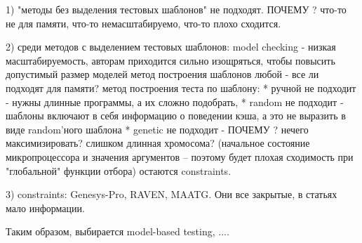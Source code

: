 \documentclass[14pt]{extreport}
\begin{document}
1) "методы без выделения тестовых шаблонов" не подходят. ПОЧЕМУ ? что-то не для памяти, что-то немасштабируемо, что-то плохо сходится.

2) среди методов с выделением тестовых шаблонов:
		model checking - низкая масштабируемость, авторам приходится сильно изощряться, чтобы повысить допустимый размер моделей
		метод построения шаблонов любой - все ли подходят для памяти?
		метод построения теста по шаблону:
			* ручной не подходит - нужны длинные программы, а их сложно подобрать,
			* random не подходит - шаблоны включают в себя информацию о поведении кэша, а это не выразить в виде random'ного шаблона
			* genetic не подходит - ПОЧЕМУ ? нечего максимизировать? слишком длинная хромосома? (начальное состояние микропроцессора и значения аргументов -- поэтому будет плохая сходимость при "глобальной" функции отбора)
			остаются constraints.
		
3) constraints: Genesys-Pro, RAVEN, MAATG. Они все закрытые, в статьях мало информации.

Таким образом, выбирается model-based testing, ....

\end{document}

